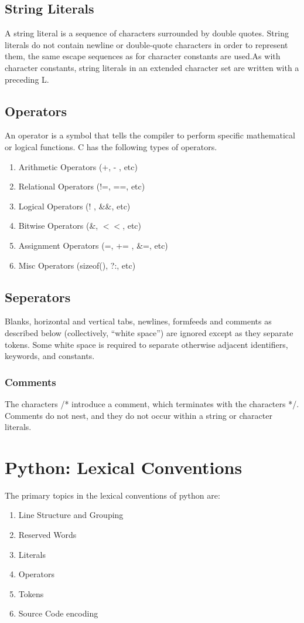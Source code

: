 \documentclass[12pt]{article}
\begin{document}
\subsection{String Literals}
A string literal is a sequence of characters surrounded by double quotes. String
literals do not contain newline or double-quote characters in order to represent them, the same escape sequences as for character constants are used.As with character constants, string literals in an extended character set are written with a preceding L.

\subsection{Operators}
An operator is a symbol that tells the compiler to perform specific mathematical or logical functions. C has the following types of operators.
\begin{enumerate}
\item Arithmetic Operators (+, - , etc)
\item Relational Operators (!=, ==, etc)
\item Logical Operators (! , \&\&, etc)
\item Bitwise Operators (\&, $<<$, etc)
\item Assignment Operators (=, += , \&=, etc)
\item Misc Operators (sizeof(), ?:, etc)
\end{enumerate}
\subsection{Seperators}
Blanks, horizontal and vertical tabs, newlines, formfeeds and comments as
described below (collectively, ``white space'') are ignored except as they separate tokens.
Some white space is required to separate otherwise adjacent identifiers, keywords, and
constants.
\subsubsection{Comments}
The characters /* introduce a comment, which terminates with the characters */. Comments
do not nest, and they do not occur within a string or character literals.
\newpage
\section{Python: Lexical Conventions}
The primary topics in the lexical conventions of python are:
\begin{enumerate}
\item Line Structure and Grouping
\item Reserved Words
\item Literals
\item Operators
\item Tokens
\item Source Code encoding
\end{enumerate}
\end{document}
